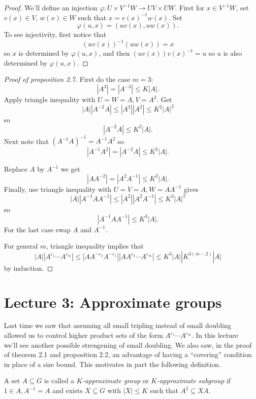 \documentclass[a4paper]{article}
\begin{document}
\begin{proof}
  We'll define an injection \(\varphi: U \times V^{-1}W \to UV \times UW\). First for \(x \in V^{-1}W\), set \(v(x) \in V\), \(w(x) \in W\) such that \(x = v(x)^{-1}w(x)\). Set
  \[
    \varphi(u, x) = (uv(x), uw(x)).
  \]
  To see injectivity, first notice that
  \[
    (uv(x))^{-1}(uw(x)) = x
  \]
  so \(x\) is determined by \(\varphi(u, x)\), and then \((uv(x)) v(x)^{-1} = u\) so \(u\) is also determined by \(\varphi(u, x)\).
\end{proof}

\begin{proof}[Proof of proposition 2.7]
  First do the case \(m = 3\):
  \[
    |A^3| = |A^{-3}| \leq K|A|.
  \]
  Apply triangle inequality with \(U = W = A, V = A^2\). Get
  \[
    |A||A^{-2}A| \leq |A^3| |A^2| \leq K^2 |A|^2
  \]
  so
  \[
    |A^{-2}A| \leq K^2 |A|.
  \]
  Next note that \((A^{-1}A)^{-1} = A^{-1}A^2\) so
  \[
    |A^{-1}A^2| = |A^{-2}A| \leq K^2|A|.
  \]

  Replace \(A\) by \(A^{-1}\) we get
  \[
    |AA^{-2}| = |A^2A^{-1}| \leq K^2 |A|.
  \]
  Finally, use triangle inequality with \(U = V = A, W = AA^{-1}\) gives
  \[
    |A| |A^{-1}AA^{-1}| \leq |A^2| |A^2A^{-1}| \leq K^3 |A|^2
  \]
  so
  \[
    |A^{-1}AA^{-1}| \leq K^3 |A|.
  \]
  For the last case swap \(A\) and \(A^{-1}\).

  For general \(m\), triangle inequality implies that
  \[
    |A| |A^{\varepsilon_1} \cdots A^{\varepsilon_m}|
    \leq |AA^{-\varepsilon_2}A^{-\varepsilon_1}| |AA^{\varepsilon_3} \cdots A^{\varepsilon_m}|
    \leq K^3 |A| |K^{3(m - 2)} |A|
  \]
  by induction.
\end{proof}

\section{Lecture 3: Approximate groups}

Last time we saw that assuming all small tripling instead of small doubling allowed us to control higher product sets of the form \(A^{\varepsilon_1} \cdots A^{\varepsilon_m}\). In this lecture we'll see another possible strengening of small doubling. We also saw, in the proof of theorem 2.1 and proposition 2.2, an advantage of having a ``covering'' condition in place of a size bound. This motivates in part the following definition.

\begin{definition}
  A set \(A \subseteq G\) is called a \emph{\(K\)-approximate group} or \emph{\(K\)-approximate subgroup} if \(1 \in A, A^{-1} = A\) and exists \(X \subseteq G\) with \(|X| \leq K\) such that \(A^2 \subseteq XA\).
\end{definition}
\end{document}
